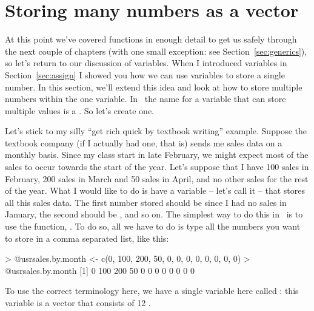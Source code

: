 \section{Storing many numbers as a vector~\label{sec:vectors}}

At this point we've covered functions in enough detail to get us safely through the next couple of chapters (with one small exception: see Section~\ref{sec:generics}), so let's return to our discussion of variables. When I introduced variables in Section~\ref{sec:assign} I showed you how we can use variables to store a single number. In this section, we'll extend this idea and look at how to store multiple numbers within the one variable. In \R\, the name for a variable that can store multiple values is a . So let's create one. 


Let's stick to my silly ``get rich quick by textbook writing'' example. Suppose the textbook company (if I actually had one, that is) sends me sales data on a monthly basis. Since my class start in late February, we might expect most of the sales to occur towards the start of the year. Let's suppose that I have 100 sales in February, 200 sales in March and 50 sales in April, and no other sales for the rest of the year. What I would like to do is have a variable -- let's call it  -- that stores all this sales data. The first number stored should be  since I had no sales in January, the second should be , and so on. The simplest way to do this in \R\ is to use the  function, . To do so, all we have to do is type all the numbers you want to store in a comma separated list, like this:
\begin{rblock1}
> @usr{sales.by.month <- c(0, 100, 200, 50, 0, 0, 0, 0, 0, 0, 0, 0)}
> @usr{sales.by.month}
 [1]   0 100 200  50   0   0   0   0   0   0   0   0
\end{rblock1}
To use the correct terminology here, we have a single variable here called : this variable is a vector that consists of 12 . 






